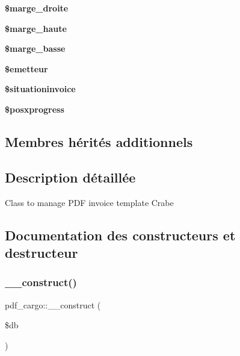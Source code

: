 \begin{DoxyCompactItemize}
{\bfseries \$marge\+\_\+droite}
\item 
\mbox{\label{classpdf__cargo_ac982ee8c9a340265227e99e4b36e74c3}} 
{\bfseries \$marge\+\_\+haute}
\item 
\mbox{\label{classpdf__cargo_a29fbac87866d26851ab72922b215912b}} 
{\bfseries \$marge\+\_\+basse}
\item 
\mbox{\label{classpdf__cargo_a2310988445f85cde28e884ba50352928}} 
{\bfseries \$emetteur}
\item 
\mbox{\label{classpdf__cargo_a9bb00f13da32b2509ea7c15675f45e95}} 
{\bfseries \$situationinvoice}
\item 
\mbox{\label{classpdf__cargo_abec951f60d8ad09f214c7c0682cff377}} 
{\bfseries \$posxprogress}
\end{DoxyCompactItemize}
\subsection*{Membres hérités additionnels}


\subsection{Description détaillée}
Class to manage P\+DF invoice template Crabe 

\subsection{Documentation des constructeurs et destructeur}
\mbox{\label{classpdf__cargo_a60d7fe0266531b0e079725d2fd5a7f07}} 
\subsubsection{\texorpdfstring{\+\_\+\+\_\+construct()}{\_\_construct()}}
{\footnotesize\ttfamily pdf\+\_\+cargo\+::\+\_\+\+\_\+construct (\begin{DoxyParamCaption}\item[{}]{\$db }\end{DoxyParamCaption})}

